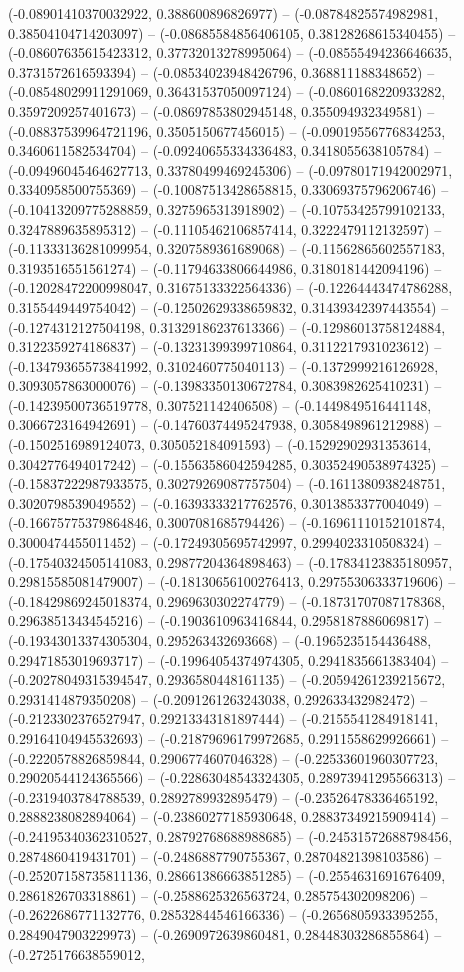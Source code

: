 (-0.08901410370032922, 0.388600896826977) -- (-0.08784825574982981, 0.38504104714203097) -- (-0.08685584856406105, 0.38128268615340455) -- (-0.08607635615423312, 0.37732013278995064) -- (-0.08555494236646635, 0.3731572616593394) -- (-0.08534023948426796, 0.368811188348652) -- (-0.08548029911291069, 0.36431537050097124) -- (-0.0860168220933282, 0.3597209257401673) -- (-0.08697853802945148, 0.355094932349581) -- (-0.08837539964721196, 0.3505150677456015) -- (-0.09019556776834253, 0.3460611582534704) -- (-0.09240655334336483, 0.3418055638105784) -- (-0.09496045464627713, 0.33780499469245306) -- (-0.09780171942002971, 0.3340958500755369) -- (-0.10087513428658815, 0.33069375796206746) -- (-0.10413209775288859, 0.3275965313918902) -- (-0.10753425799102133, 0.3247889635895312) -- (-0.11105462106857414, 0.3222479112132597) -- (-0.11333136281099954, 0.3207589361689068) -- (-0.11562865602557183, 0.3193516551561274) -- (-0.11794633806644986, 0.3180181442094196) -- (-0.12028472200998047, 0.31675133322564336) -- (-0.12264443474786288, 0.3155449449754042) -- (-0.12502629338659832, 0.31439342397443554) -- (-0.1274312127504198, 0.31329186237613366) -- (-0.12986013758124884, 0.3122359274186837) -- (-0.13231399399710864, 0.3112217931023612) -- (-0.13479365573841992, 0.3102460775040113) -- (-0.1372999216126928, 0.3093057863000076) -- (-0.13983350130672784, 0.3083982625410231) -- (-0.14239500736519778, 0.307521142406508) -- (-0.1449849516441148, 0.3066723164942691) -- (-0.14760374495247938, 0.3058498961212988) -- (-0.1502516989124073, 0.305052184091593) -- (-0.15292902931353614, 0.3042776494017242) -- (-0.15563586042594285, 0.30352490538974325) -- (-0.15837222987933575, 0.30279269087757504) -- (-0.1611380938248751, 0.3020798539049552) -- (-0.16393333217762576, 0.3013853377004049) -- (-0.16675775379864846, 0.3007081685794426) -- (-0.16961110152101874, 0.3000474455011452) -- (-0.17249305695742997, 0.2994023310508324) -- (-0.17540324505141083, 0.29877204364898463) -- (-0.17834123835180957, 0.29815585081479007) -- (-0.18130656100276413, 0.29755306333719606) -- (-0.18429869245018374, 0.2969630302274779) -- (-0.18731707087178368, 0.29638513434545216) -- (-0.1903610963416844, 0.2958187886069817) -- (-0.19343013374305304, 0.295263432693668) -- (-0.1965235154436488, 0.29471853019693717) -- (-0.19964054374974305, 0.2941835661383404) -- (-0.20278049315394547, 0.2936580448161135) -- (-0.20594261239215672, 0.2931414879350208) -- (-0.2091261263243038, 0.292633432982472) -- (-0.2123302376527947, 0.29213343181897444) -- (-0.2155541284918141, 0.29164104945532693) -- (-0.21879696179972685, 0.2911558629926661) -- (-0.2220578826859844, 0.2906774607046328) -- (-0.22533601960307723, 0.29020544124365566) -- (-0.22863048543324305, 0.28973941295566313) -- (-0.2319403784788539, 0.2892789932895479) -- (-0.23526478336465192, 0.2888238082894064) -- (-0.23860277185930648, 0.28837349215909414) -- (-0.24195340362310527, 0.28792768688988685) -- (-0.24531572688798456, 0.2874860419431701) -- (-0.2486887790755367, 0.28704821398103586) -- (-0.25207158735811136, 0.28661386663851285) -- (-0.2554631691676409, 0.2861826703318861) -- (-0.2588625326563724, 0.285754302098206) -- (-0.2622686771132776, 0.28532844546166336) -- (-0.2656805933395255, 0.2849047903229973) -- (-0.2690972639860481, 0.28448303286855864) -- (-0.2725176638559012, 